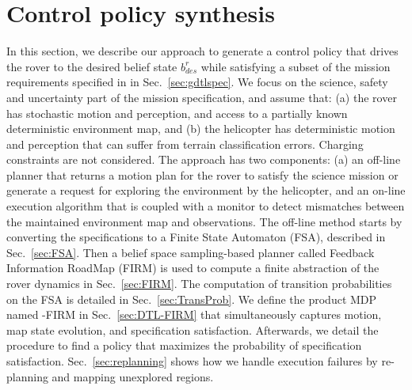 \documentclass[conference]{IEEEtran}
\begin{document}
	
\section{Control policy synthesis} \label{sec:planner}
In this section, we describe our approach to generate a control policy that drives the rover to the desired belief state $b^r_{des}$ while satisfying a subset of the mission requirements specified in \DTL in Sec.~\ref{sec:gdtlspec}.
We focus on the science, safety and uncertainty part of the mission specification, and assume that: (a) the rover has stochastic motion and perception, and access to a partially known deterministic environment map, and (b) the helicopter has deterministic motion and perception that can suffer from terrain classification errors.
Charging constraints are not considered.
The approach has two components: (a) an off-line planner that returns a motion plan for the rover to satisfy the science mission or generate a request for exploring the environment by the helicopter, and an on-line execution algorithm that is coupled with a monitor to detect mismatches between the maintained environment map and observations.
The off-line method starts by converting the \DTL specifications to a Finite State Automaton (FSA), described in Sec.~\ref{sec:FSA}. Then a belief space sampling-based planner called Feedback Information RoadMap (FIRM) is used to compute a finite abstraction of the rover dynamics in Sec.~\ref{sec:FIRM}. The computation of transition probabilities on the FSA is detailed in Sec.~\ref{sec:TransProb}. We define the product MDP named \DTL-FIRM in Sec.~\ref{sec:DTL-FIRM} that simultaneously captures motion, map state evolution, and specification satisfaction. Afterwards, we detail the procedure to find a policy that maximizes the probability of specification satisfaction. Sec.~\ref{sec:replanning} shows how we handle execution failures by re-planning and mapping unexplored regions.

\end{document}
